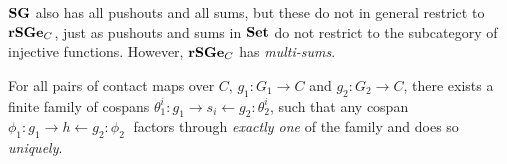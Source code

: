 $\mathbf{SG}$ also has all pushouts and all sums,
but these do not in general restrict to $\mathbf{rSGe}_C$, %
just as pushouts and sums in $\mathbf{Set}$ do not restrict to
the subcategory of injective functions. %
However, $\mathbf{rSGe}_C$ has \emph{multi-sums}.

\begin{lemma}\label{lemma:mg}
  For all pairs of contact maps over $C$,
  $g_1: G_1 \to C$ and $g_2: G_2 \to C$,
  there exists a finite family of cospans
  $\theta^i_1: g_1 \to s_i \gets g_2 :\theta^i_2$,
  such that any cospan $\phi_1: g_1 \to h \gets g_2 :\phi_2\;$
  factors through \emph{exactly one} of the family
  and does so \emph{uniquely}.
  \begin{center}
  \end{center}
\end{lemma}
